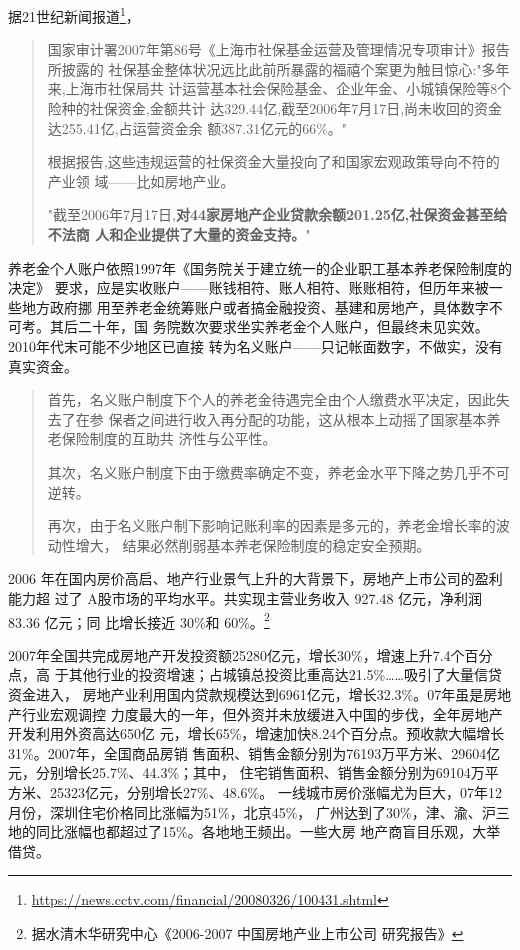 据21世纪新闻报道\footnote{\url{https://news.cctv.com/financial/20080326/100431.shtml}}，
\begin{quotation}
  国家审计署2007年第86号《上海市社保基金运营及管理情况专项审计》报告所披露的
  社保基金整体状况远比此前所暴露的福禧个案更为触目惊心:"多年来,上海市社保局共
  计运营基本社会保险基金、企业年金、小城镇保险等8个险种的社保资金,金额共计
  达329.44亿,截至2006年7月17日,尚未收回的资金达255.41亿,占运营资金余
  额387.31亿元的66\%。"

  根据报告,这些违规运营的社保资金大量投向了和国家宏观政策导向不符的产业领
  域——比如房地产业。

  "截至2006年7月17日,\textbf{对44家房地产企业贷款余额201.25亿,社保资金甚至给不法商
    人和企业提供了大量的资金支持。}"
\end{quotation}

养老金个人账户依照1997年《国务院关于建立统一的企业职工基本养老保险制度的决定》
要求，应是实收账户——账钱相符、账人相符、账账相符，但历年来被一些地方政府挪
用至养老金统筹账户或者搞金融投资、基建和房地产，具体数字不可考。其后二十年，国
务院数次要求坐实养老金个人账户，但最终未见实效。2010年代末可能不少地区已直接
转为名义账户——只记帐面数字，不做实，没有真实资金。
\begin{quotation}
  首先，名义账户制度下个人的养老金待遇完全由个人缴费水平决定，因此失去了在参
  保者之间进行收入再分配的功能，这从根本上动摇了国家基本养老保险制度的互助共
  济性与公平性。

  其次，名义账户制度下由于缴费率确定不变，养老金水平下降之势几乎不可逆转。

  再次，由于名义账户制下影响记账利率的因素是多元的，养老金增长率的波动性增大，
  结果必然削弱基本养老保险制度的稳定安全预期。\cite{mingyizhanghu}
\end{quotation}


2006 年在国内房价高启、地产行业景气上升的大背景下，房地产上市公司的盈利能力超
过了 A股市场的平均水平。共实现主营业务收入 927.48 亿元，净利润 83.36 亿元；同
比增长接近 30\%和 60\%。\footnote{据水清木华研究中心《2006-2007 中国房地产业上市公司
  研究报告》}

2007年全国共完成房地产开发投资额25280亿元，增长30\%，增速上升7.4个百分点，高
于其他行业的投资增速；占城镇总投资比重高达21.5\%……吸引了大量信贷资金进入，
房地产业利用国内贷款规模达到6961亿元，增长32.3\%。07年虽是房地产行业宏观调控
力度最大的一年，但外资并未放缓进入中国的步伐，全年房地产开发利用外资高达650亿
元，增长65\%，增速加快8.24个百分点。预收款大幅增长31\%。2007年，全国商品房销
售面积、销售金额分别为76193万平方米、29604亿元，分别增长25.7\%、44.3\%；其中，
住宅销售面积、销售金额分别为69104万平方米、25323亿元，分别增长27\%、48.6\%。
一线城市房价涨幅尤为巨大，07年12月份，深圳住宅价格同比涨幅为51\%，北京45\%，
广州达到了30\%，津、渝、沪三地的同比涨幅也都超过了15\%。各地地王频出。一些大房
地产商盲目乐观，大举借贷。

